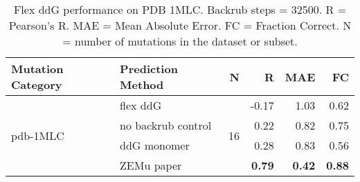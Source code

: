 \begin{table}
  \begin{tabular}{llrrrr}
\toprule
Mutation Category &   Prediction Method &   N &     R &  MAE &   FC \\
\midrule
 \multirow{ 4}{*}{pdb-1MLC} & flex ddG & \multirow{ 4}{*}{16} & -0.17 & 1.03 & 0.62  \\
 & no backrub control & & 0.22 & 0.82 & 0.75  \\
 & ddG monomer & & 0.28 & 0.83 & 0.56  \\
 & ZEMu paper & & \textbf{0.79} & \textbf{0.42} & \textbf{0.88}  \\
\bottomrule
\end{tabular}
  \caption[Flex ddG performance on PDB 1MLC]{
    Flex ddG performance on PDB 1MLC. Backrub steps = 32500. R = Pearson's R. MAE = Mean Absolute Error. FC = Fraction Correct. N = number of mutations in the dataset or subset.
  } \label{tab:table-pdb-1MLC}
\end{table}
